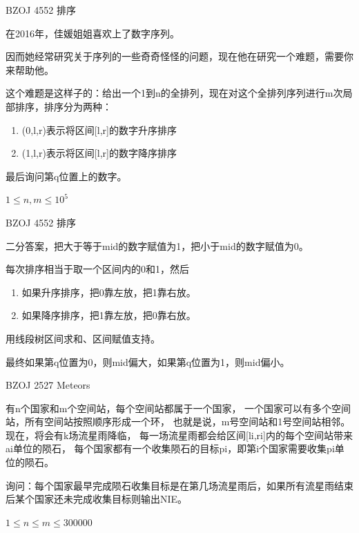 \documentclass{beamer}
\begin{document}
\begin{frame}{BZOJ 4552 排序}

    在2016年，佳媛姐姐喜欢上了数字序列。

    因而她经常研究关于序列的一些奇奇怪怪的问题，现在他在研究一个难题，需要你来帮助他。

    这个难题是这样子的：给出一个1到n的全排列，现在对这个全排列序列进行m次局部排序，排序分为两种：

    \begin{enumerate}
        \item (0,l,r)表示将区间[l,r]的数字升序排序
        \item (1,l,r)表示将区间[l,r]的数字降序排序
    \end{enumerate}

    最后询问第q位置上的数字。

    $1 \leq n,m \leq 10^5$

\end{frame}

\begin{frame}{BZOJ 4552 排序}

    二分答案，把大于等于mid的数字赋值为1，把小于mid的数字赋值为0。

    每次排序相当于取一个区间内的0和1，然后

    \begin{enumerate}
        \item 如果升序排序，把0靠左放，把1靠右放。
        \item 如果降序排序，把1靠左放，把0靠右放。
    \end{enumerate}
    
    用线段树区间求和、区间赋值支持。

    最终如果第q位置为0，则mid偏大，如果第q位置为1，则mid偏小。
    
\end{frame}

\begin{frame}{BZOJ 2527 Meteors}

    有n个国家和m个空间站，每个空间站都属于一个国家，
    一个国家可以有多个空间站，所有空间站按照顺序形成一个环，
    也就是说，m号空间站和1号空间站相邻。
    现在，将会有k场流星雨降临，
    每一场流星雨都会给区间[li,ri]内的每个空间站带来ai单位的陨石，
    每个国家都有一个收集陨石的目标pi，即第i个国家需要收集pi单位的陨石。 
    
    询问：每个国家最早完成陨石收集目标是在第几场流星雨后，如果所有流星雨结束后某个国家还未完成收集目标则输出NIE。

    $1\leq n \leq m \leq 300000$

\end{frame}
\end{document}
